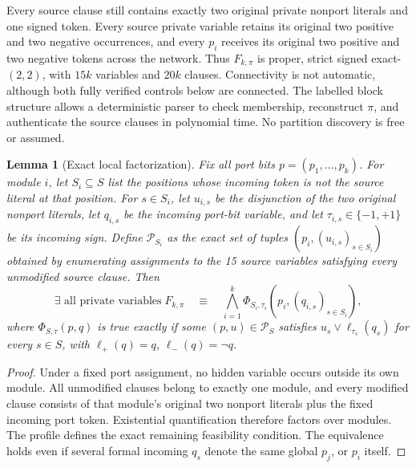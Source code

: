 \documentclass[11pt]{article}
\newtheorem{lemma}{Lemma}
\begin{document}
Every source clause still contains exactly two original private nonport literals and one signed token. Every source private variable retains its original two positive and two negative occurrences, and every $p_i$ receives its original two positive and two negative tokens across the network. Thus $F_{k,\pi}$ is proper, strict signed exact-$(2,2)$, with $15k$ variables and $20k$ clauses. Connectivity is not automatic, although both fully verified controls below are connected. The labelled block structure allows a deterministic parser to check membership, reconstruct $\pi$, and authenticate the source clauses in polynomial time. No partition discovery is free or assumed.

\begin{lemma}[Exact local factorization]\label{lem:factor}
Fix all port bits $p=(p_1,\ldots,p_k)$. For module $i$, let $S_i\subseteq S$ list the positions whose incoming token is not the source literal at that position. For $s\in S_i$, let $u_{i,s}$ be the disjunction of the two original nonport literals, let $q_{i,s}$ be the incoming port-bit variable, and let $\tau_{i,s}\in\{-1,+1\}$ be its incoming sign. Define $\mathcal P_{S_i}$ as the exact set of tuples $(p_i,(u_{i,s})_{s\in S_i})$ obtained by enumerating assignments to the 15 source variables satisfying every \emph{unmodified} source clause. Then
\[
 \exists\text{ all private variables}\;F_{k,\pi}\quad\equiv\quad
 \bigwedge_{i=1}^k\Phi_{S_i,\tau_i}\left(p_i,(q_{i,s})_{s\in S_i}\right),
\]
where $\Phi_{S,\tau}(p,q)$ is true exactly if some $(p,u)\in\mathcal P_S$ satisfies
$u_s\lor\ell_{\tau_s}(q_s)$ for every $s\in S$, with
$\ell_+(q)=q$, $\ell_-(q)=\neg q$.
\end{lemma}
\begin{proof}
Under a fixed port assignment, no hidden variable occurs outside its own module. All unmodified clauses belong to exactly one module, and every modified clause consists of that module's original two nonport literals plus the fixed incoming port token. Existential quantification therefore factors over modules. The profile defines the exact remaining feasibility condition. The equivalence holds even if several formal incoming $q_s$ denote the same global $p_j$, or $p_i$ itself.
\end{proof}
\end{document}
